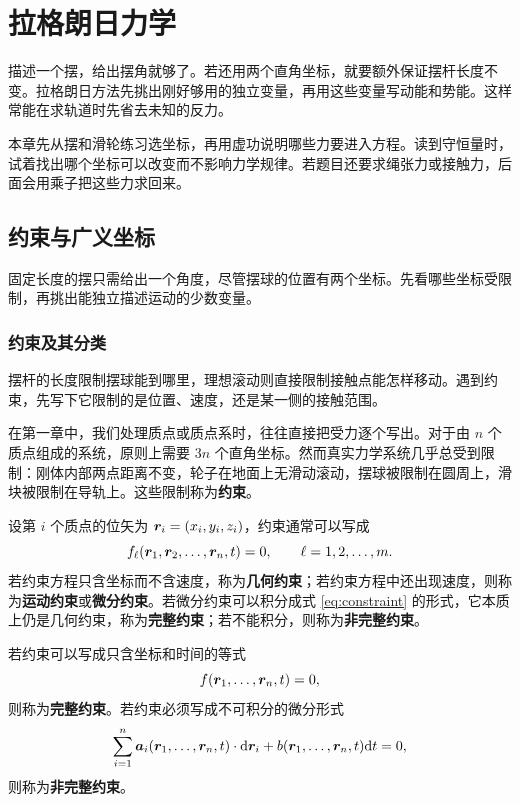 \chapter{拉格朗日力学}\label{ch:lagrange}

\begin{guidebox}
描述一个摆，给出摆角就够了。若还用两个直角坐标，就要额外保证摆杆长度不变。拉格朗日方法先挑出刚好够用的独立变量，再用这些变量写动能和势能。这样常能在求轨道时先省去未知的反力。

本章先从摆和滑轮练习选坐标，再用虚功说明哪些力要进入方程。读到守恒量时，试着找出哪个坐标可以改变而不影响力学规律。若题目还要求绳张力或接触力，后面会用乘子把这些力求回来。
\end{guidebox}

\section{约束与广义坐标}

固定长度的摆只需给出一个角度，尽管摆球的位置有两个坐标。先看哪些坐标受限制，再挑出能独立描述运动的少数变量。

\subsection{约束及其分类}

摆杆的长度限制摆球能到哪里，理想滚动则直接限制接触点能怎样移动。遇到约束，先写下它限制的是位置、速度，还是某一侧的接触范围。

在第一章中，我们处理质点或质点系时，往往直接把受力逐个写出。对于由 $n$ 个质点组成的系统，原则上需要 $3n$ 个直角坐标。然而真实力学系统几乎总受到限制：刚体内部两点距离不变，轮子在地面上无滑动滚动，摆球被限制在圆周上，滑块被限制在导轨上。这些限制称为\textbf{约束}。

设第 $i$ 个质点的位矢为 $\boldsymbol{r}_i=(x_i,y_i,z_i)$，约束通常可以写成
\begin{equation}
f_\ell(\boldsymbol{r}_1,\boldsymbol{r}_2,\dots,\boldsymbol{r}_n,t)=0,
\qquad \ell=1,2,\dots,m.
\label{eq:constraint}
\end{equation}
若约束方程只含坐标而不含速度，称为\textbf{几何约束}；若约束方程中还出现速度，则称为\textbf{运动约束}或\textbf{微分约束}。若微分约束可以积分成式 \eqref{eq:constraint} 的形式，它本质上仍是几何约束，称为\textbf{完整约束}；若不能积分，则称为\textbf{非完整约束}。

\begin{definition}[完整约束与非完整约束]
若约束可以写成只含坐标和时间的等式
\[
f(\boldsymbol{r}_1,\dots,\boldsymbol{r}_n,t)=0,
\]
则称为\textbf{完整约束}。若约束必须写成不可积分的微分形式
\[
\sum_{i=1}^{n}\boldsymbol a_i(\boldsymbol{r}_1,\dots,\boldsymbol{r}_n,t)\cdot \mathrm{d}\boldsymbol{r}_i
+b(\boldsymbol{r}_1,\dots,\boldsymbol{r}_n,t)\mathrm{d} t=0,
\]
则称为\textbf{非完整约束}。
\end{definition}

